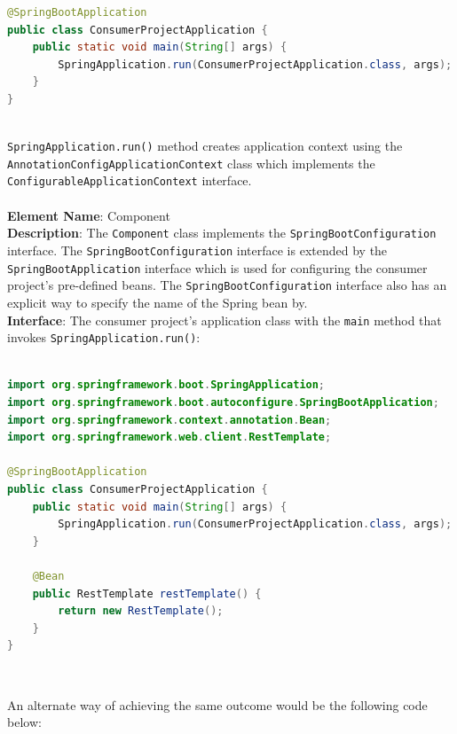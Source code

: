 {\begin{lstlisting}[language=Java, caption=Creating application context for non-web application, label=AnnotationConfigApplicationContext]
@SpringBootApplication
public class ConsumerProjectApplication {
    public static void main(String[] args) {
        SpringApplication.run(ConsumerProjectApplication.class, args);
    }
}
\end{lstlisting}\ \\

\texttt{SpringApplication.run()} method creates application context using the \texttt{AnnotationConfigApplicationContext} class which implements the \texttt{ConfigurableApplicationContext} interface.\\

\noindent\makebox[\linewidth]{\rule{\textwidth}{3pt}}\ \\

\textbf{Element Name}: Component\\
\textbf{Description}: The \texttt{Component} class implements the \texttt{SpringBootConfiguration} interface. The \texttt{SpringBootConfiguration} interface is extended by the \texttt{SpringBootApplication} interface which is used for configuring the consumer project's pre-defined beans. The \texttt{SpringBootConfiguration} interface also has an explicit way to specify the name of the Spring bean by.\\
\textbf{Interface}: The consumer project's application class with the \texttt{main} method that invokes \texttt{SpringApplication.run()}:\\

\clearpage

\begin{lstlisting}[language=Java, caption=Consumer Project creating pre-defined beans using SpringBootApplication]

import org.springframework.boot.SpringApplication;
import org.springframework.boot.autoconfigure.SpringBootApplication;
import org.springframework.context.annotation.Bean;
import org.springframework.web.client.RestTemplate;

@SpringBootApplication
public class ConsumerProjectApplication {
    public static void main(String[] args) {
        SpringApplication.run(ConsumerProjectApplication.class, args);
    }
    
    @Bean
    public RestTemplate restTemplate() {
        return new RestTemplate();
    }
}
\end{lstlisting}\ \\

\clearpage

An alternate way of achieving the same outcome would be the following code below:\\

}
